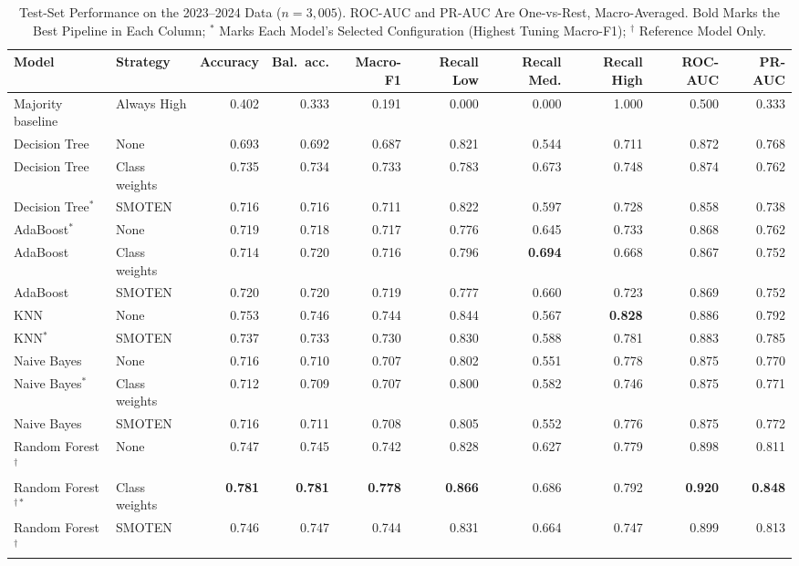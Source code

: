 \documentclass[conference]{IEEEtran}
\begin{document}
\begin{table}[t]
\caption{Test-Set Performance on the 2023--2024 Data ($n = 3{,}005$). ROC-AUC and PR-AUC Are One-vs-Rest, Macro-Averaged. Bold Marks the Best Pipeline in Each Column; $^\ast$ Marks Each Model's Selected Configuration (Highest Tuning Macro-F1); $^\dagger$ Reference Model Only.}
\label{tab:test}
\centering
\footnotesize
\setlength{\tabcolsep}{5pt}
\begin{tabular}{@{}llrrrrrrrr@{}}
\toprule
Model & Strategy & Accuracy & Bal.\ acc. & Macro-F1 & Recall Low & Recall Med. & Recall High & ROC-AUC & PR-AUC \\
\midrule
Majority baseline & Always High & 0.402 & 0.333 & 0.191 & 0.000 & 0.000 & 1.000 & 0.500 & 0.333 \\
\midrule
Decision Tree & None & 0.693 & 0.692 & 0.687 & 0.821 & 0.544 & 0.711 & 0.872 & 0.768 \\
Decision Tree & Class weights & 0.735 & 0.734 & 0.733 & 0.783 & 0.673 & 0.748 & 0.874 & 0.762 \\
Decision Tree$^\ast$ & SMOTEN & 0.716 & 0.716 & 0.711 & 0.822 & 0.597 & 0.728 & 0.858 & 0.738 \\
AdaBoost$^\ast$ & None & 0.719 & 0.718 & 0.717 & 0.776 & 0.645 & 0.733 & 0.868 & 0.762 \\
AdaBoost & Class weights & 0.714 & 0.720 & 0.716 & 0.796 & \textbf{0.694} & 0.668 & 0.867 & 0.752 \\
AdaBoost & SMOTEN & 0.720 & 0.720 & 0.719 & 0.777 & 0.660 & 0.723 & 0.869 & 0.752 \\
KNN & None & 0.753 & 0.746 & 0.744 & 0.844 & 0.567 & \textbf{0.828} & 0.886 & 0.792 \\
KNN$^\ast$ & SMOTEN & 0.737 & 0.733 & 0.730 & 0.830 & 0.588 & 0.781 & 0.883 & 0.785 \\
Naive Bayes & None & 0.716 & 0.710 & 0.707 & 0.802 & 0.551 & 0.778 & 0.875 & 0.770 \\
Naive Bayes$^\ast$ & Class weights & 0.712 & 0.709 & 0.707 & 0.800 & 0.582 & 0.746 & 0.875 & 0.771 \\
Naive Bayes & SMOTEN & 0.716 & 0.711 & 0.708 & 0.805 & 0.552 & 0.776 & 0.875 & 0.772 \\
\midrule
Random Forest$^\dagger$ & None & 0.747 & 0.745 & 0.742 & 0.828 & 0.627 & 0.779 & 0.898 & 0.811 \\
Random Forest$^{\dagger\ast}$ & Class weights & \textbf{0.781} & \textbf{0.781} & \textbf{0.778} & \textbf{0.866} & 0.686 & 0.792 & \textbf{0.920} & \textbf{0.848} \\
Random Forest$^\dagger$ & SMOTEN & 0.746 & 0.747 & 0.744 & 0.831 & 0.664 & 0.747 & 0.899 & 0.813 \\
\bottomrule
\end{tabular}
\end{table}
\end{document}
